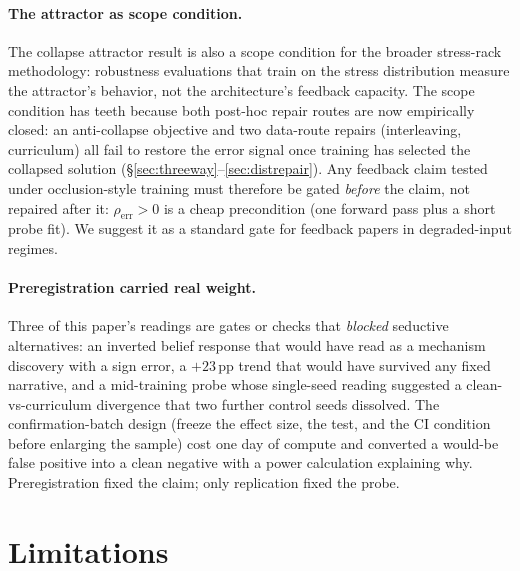 \documentclass[10pt]{article}
\newcommand{\rhoerr}{\rho_{\mathrm{err}}}
\begin{document}
\paragraph{The attractor as scope condition.}
The collapse attractor result is also a scope condition for the broader
stress-rack methodology: robustness evaluations that train on the stress
distribution measure the attractor's behavior, not the architecture's
feedback capacity. The scope condition has teeth because both post-hoc
repair routes are now empirically closed: an anti-collapse objective and
two data-route repairs (interleaving, curriculum) all fail to restore the
error signal once training has selected the collapsed solution
(\S\ref{sec:threeway}--\ref{sec:distrepair}). Any feedback claim tested
under occlusion-style training must therefore be gated \emph{before} the
claim, not repaired after it: $\rhoerr > 0$ is a cheap precondition (one
forward pass plus a short probe fit). We suggest it as a standard gate for
feedback papers in degraded-input regimes.

\paragraph{Preregistration carried real weight.}
Three of this paper's readings are gates or checks that \emph{blocked}
seductive alternatives: an inverted belief response that would have read
as a mechanism discovery with a sign error, a $+23$\,pp trend that
would have survived any fixed narrative, and a mid-training probe whose
single-seed reading suggested a clean-vs-curriculum divergence that two
further control seeds dissolved. The confirmation-batch design
(freeze the effect size, the test, and the CI condition before enlarging
the sample) cost one day of compute and converted a would-be false
positive into a clean negative with a power calculation explaining why.
Preregistration fixed the claim; only replication fixed the probe.

\section{Limitations}
\label{sec:limitations}
\end{document}
